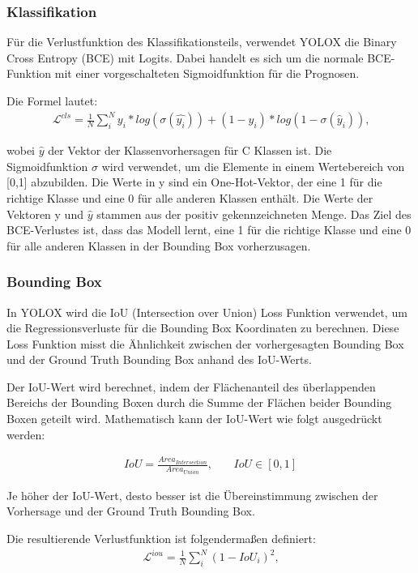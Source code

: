 \subsubsection{Klassifikation}\label{chap:yoloxClassification}
Für die Verlustfunktion des Klassifikationsteils, verwendet YOLOX die Binary Cross Entropy (BCE) mit Logits. Dabei handelt es sich um die normale BCE-Funktion mit einer vorgeschalteten Sigmoidfunktion für die Prognosen.

Die Formel lautet:
\begin{align}
	\mathcal{L}^{cls}=\frac{1}{N}\sum_{i}^{N}y_i*log(\sigma(\hat{y_i}))+(1-y_i)*log(1-\sigma(\hat{y}_i))\text{,}
\end{align}

wobei $\hat{y}$ der Vektor der Klassenvorhersagen für C Klassen ist. Die Sigmoidfunktion $\sigma$ wird verwendet, um die Elemente in einem Wertebereich von [0,1] abzubilden. Die Werte in y sind ein One-Hot-Vektor, der eine 1 für die richtige Klasse und eine 0 für alle anderen Klassen enthält. Die Werte der Vektoren y und $\hat{y}$ stammen aus der positiv gekennzeichneten Menge. Das Ziel des BCE-Verlustes ist, dass das Modell lernt, eine 1 für die richtige Klasse und eine 0 für alle anderen Klassen in der Bounding Box vorherzusagen. \cite{yoloxExplanationHowWorks}

\subsubsection{Bounding Box}
In YOLOX wird die IoU (Intersection over Union) Loss Funktion verwendet, um die Regressionsverluste für die Bounding Box Koordinaten zu berechnen. Diese Loss Funktion misst die Ähnlichkeit zwischen der vorhergesagten Bounding Box und der Ground Truth Bounding Box anhand des IoU-Werts.

Der IoU-Wert wird berechnet, indem der Flächenanteil des überlappenden Bereichs der Bounding Boxen durch die Summe der Flächen beider Bounding Boxen geteilt wird. Mathematisch kann der IoU-Wert wie folgt ausgedrückt werden:

\begin{align}
	IoU = \frac{Area_{Intersection}}{Area_{Union}}\text{,} \qquad IoU \in [0,1]
\end{align}

Je höher der IoU-Wert, desto besser ist die Übereinstimmung zwischen der Vorhersage und der Ground Truth Bounding Box.

Die resultierende Verlustfunktion ist folgendermaßen definiert:
\begin{align}
	\mathcal{L}^{iou} = \frac{1}{N}\sum_{i}^{N}(1-IoU_i)^2 \text{,}
\end{align}

